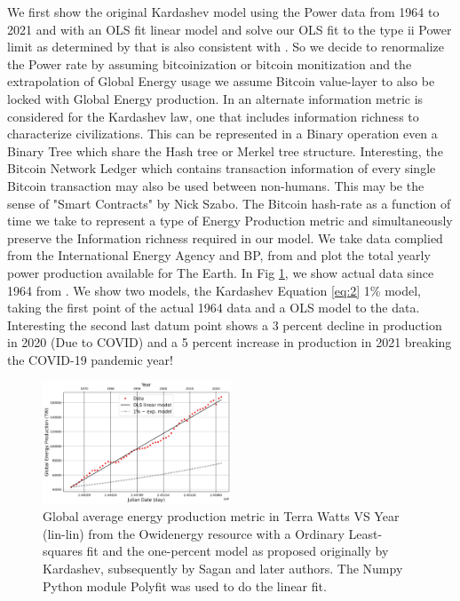 \documentclass[final,5p,times,twocolumn,authoryear]{elsarticle}
\begin{document}
We first show the original Kardashev model using the Power data from 1964 to 2021 and with an OLS fit linear model and solve our OLS fit to the type ii Power limit as determined by \cite{kar64} that is also consistent with \cite{sagan73}. So we decide to renormalize the Power rate by assuming bitcoinization or bitcoin monitization and the extrapolation of Global Energy usage we assume Bitcoin value-layer to also be locked with Global Energy production. In \cite{sagan73} an alternate information metric is considered for the Kardashev law, one that includes information richness to characterize civilizations. This can be represented in a Binary operation even a Binary Tree which share the Hash tree or Merkel tree structure. Interesting, the Bitcoin Network Ledger which contains transaction information of every single Bitcoin transaction may also be used between non-humans. This may be the sense of "Smart Contracts" by Nick Szabo. The Bitcoin hash-rate as a function of time we take to represent a type of Energy Production metric and simultaneously preserve the Information richness required in our model. We take data complied from the International Energy Agency and BP, from \cite{owidenergy} and plot the total yearly power production available for The Earth. In Fig \ref{fig:kardashev1}, we show actual data since 1964 from \cite{owidenergy}. We show two models, the Kardashev Equation \ref{eq:2} 1\% model, taking the first point of the actual 1964 data and a OLS model to the data. Interesting the second last datum point shows a 3 percent decline in production in 2020 (Due to COVID) and a 5 percent increase in production in 2021 breaking the COVID-19 pandemic year!
\begin{figure}
    \centering
    \includegraphics[width=0.5\textwidth]{figs/fig1_kar2ff.jpg}
    \caption{Global average energy production metric in Terra Watts VS Year (lin-lin) from the Owidenergy resource with a Ordinary Least-squares fit and the one-percent model as proposed originally by Kardashev, subsequently by Sagan and later authors. The Numpy Python module Polyfit was used to do the linear fit.}
    \label{fig:kardashev1}

\end{figure}
\end{document}
